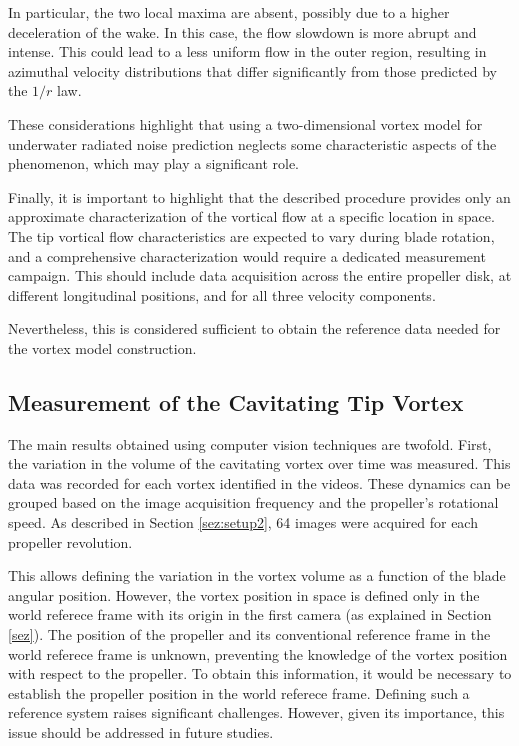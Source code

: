 In particular, the two local maxima are absent, possibly due to a higher deceleration of the wake. In this case, the flow slowdown is more abrupt and intense. This could lead to a less uniform flow in the outer region, resulting in azimuthal velocity distributions that differ significantly from those predicted by the $1/r$ law.

These considerations highlight that using a two-dimensional vortex model for underwater radiated noise prediction neglects some characteristic aspects of the phenomenon, which may play a significant role.

Finally, it is important to highlight that the described procedure provides only an approximate characterization of the vortical flow at a specific location in space.
The tip vortical flow characteristics are expected to vary during blade rotation, and a comprehensive characterization would require a dedicated measurement campaign. This should include data acquisition across the entire propeller disk, at different longitudinal positions, and for all three velocity components.

Nevertheless, this is considered sufficient to obtain the reference data needed for the vortex model construction.

\subsection{Measurement of the Cavitating Tip Vortex}
\label{sez:cvResults2}

The main results obtained using computer vision techniques are twofold.
First, the variation in the volume of the cavitating vortex over time was measured. This data was recorded for each vortex identified in the videos.
These dynamics can be grouped based on the image acquisition frequency and the propeller's rotational speed.
As described in Section \ref{sez:setup2}, 64 images were acquired for each propeller revolution.

This allows defining the variation in the vortex volume as a function of the blade angular position. However, the vortex position in space is defined only in the world referece frame with its origin in the first camera (as explained in Section \ref{sez}). 
The position of the propeller and its conventional reference frame in the world referece frame is unknown, preventing the knowledge of the vortex position with respect to the propeller.
To obtain this information, it would be necessary to establish the propeller position in the world referece frame.
Defining such a reference system raises significant challenges. However, given its importance, this issue should be addressed in future studies.

